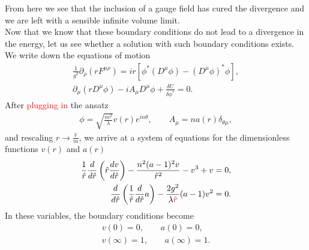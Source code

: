     From here we see that the inclusion of a gauge field has cured the divergence and we are left with a sensible infinite volume limit. \\
    \indent Now that we know that these boundary conditions do not lead to a divergence in the energy, let us see whether a solution with such boundary conditions exists. We write down the equations of motion
    \begin{align}
        \frac{1}{g^2}  \partial_{\rho}(r F^{\mu \rho}) = i r \left[\phi^* \left(D^{\mu}\phi\right) - \left(D^{\mu}\phi \right)^* \phi \right], \nonumber \\
        \partial_{\mu} \left(r D^{\mu} \phi \right) - i A_{\mu} D^{\mu} \phi + \frac{\delta U}{\delta \phi^*} =0.
    \end{align}
    After \textcolor{red}{plugging in} the ansatz
    \begin{align}
        \phi = \sqrt{\frac{m^2}{\lambda}}v(r) e^{i n \theta}, \qquad A_{\mu} = n a(r) \delta_{\theta \mu},
    \end{align}
    and rescaling $r\rightarrow \frac{\hat{r}}{m}$, we arrive at a system of equations for the dimensionless functions $v(r)$ and $a(r)$
    \begin{align}
        \frac{1}{\hat{r}} \frac{d }{d \hat{r}} \left(\hat{r} \frac{d v}{d \hat{r}} \right) - \frac{n^2 (a-1)^2 v}{\hat{r}^2} -v^3 +v =0, \label{eq:local_vortex_Higgs_scalar}  \\
        \frac{d}{d \hat{r}}\left(\frac{1}{\hat{r}}\frac{d}{d \hat{r}} a \right)- \frac{2 g^2}{\lambda \textcolor{red}{\hat{r}}} (a-1)v^2=0. \label{eq:local_vortex_Higgs_gauge}
    \end{align}
    In these variables, the boundary conditions become
    \begin{align}
        v(0) = 0, \qquad a(0)=0, \\
        v(\infty) =1, \qquad a(\infty) =1.
    \end{align}
